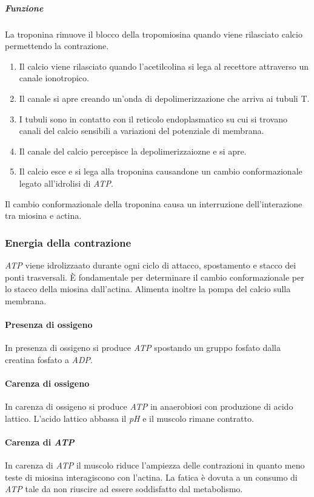 				\subparagraph{Funzione}
				La troponina rimuove il blocco della tropomiosina quando viene rilasciato calcio permettendo la contrazione.
				\begin{multicols}{2}
					\begin{enumerate}
						\item Il calcio viene rilasciato quando l'acetilcolina si lega al recettore attraverso un canale ionotropico.
						\item Il canale si apre creando un'onda di depolimerizzazione che arriva ai tubuli T.
						\item I tubuli sono in contatto con il reticolo endoplasmatico su cui si trovano canali del calcio sensibili a variazioni del potenziale di membrana.
						\item Il canale del calcio percepisce la depolimerizzaiozne e si apre.
						\item Il calcio esce e si lega alla troponina causandone un cambio conformazionale legato all'idrolisi di \emph{ATP}.
					\end{enumerate}
				\end{multicols}
				Il cambio conformazionale della troponina causa un interruzione dell'interazione tra miosina e actina.

		\subsubsection{Energia della contrazione}
		\emph{ATP} viene idrolizzaato durante ogni ciclo di attacco, spostamento e stacco dei ponti trasversali.
		\`E fondamentale per determinare il cambio conformazionale per lo stacco della miosina dall'actina.
		Alimenta inoltre la pompa del calcio sulla membrana.

			\paragraph{Presenza di ossigeno}
			In presenza di ossigeno si produce \emph{ATP} spostando un gruppo fosfato dalla creatina fosfato a \emph{ADP}.

			\paragraph{Carenza di ossigeno}
			In carenza di ossigeno si produce \emph{ATP} in anaerobiosi con produzione di acido lattico.
			L'acido lattico abbassa il \emph{pH} e il muscolo rimane contratto.

			\paragraph{Carenza di \emph{ATP}}
			In carenza di \emph{ATP} il muscolo riduce l'ampiezza delle contrazioni in quanto meno teste di miosina interagiscono con l'actina.
			La fatica \`e dovuta a un consumo di \emph{ATP} tale da non riuscire ad essere soddisfatto dal metabolismo.

